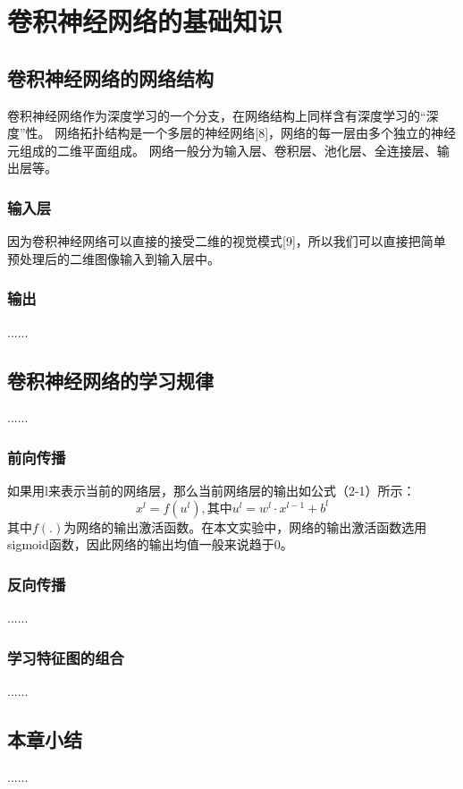 \section{卷积神经网络的基础知识}

\subsection{卷积神经网络的网络结构}
卷积神经网络作为深度学习的一个分支，在网络结构上同样含有深度学习的“深度”性。
网络拓扑结构是一个多层的神经网络[8]，网络的每一层由多个独立的神经元组成的二维平面组成。
网络一般分为输入层、卷积层、池化层、全连接层、输出层等。

\subsubsection{输入层}
因为卷积神经网络可以直接的接受二维的视觉模式[9]，所以我们可以直接把简单预处理后的二维图像输入到输入层中。

\subsubsection{输出}
......

\subsection{卷积神经网络的学习规律}
......

\subsubsection{前向传播}
如果用l来表示当前的网络层，那么当前网络层的输出如公式（2-1）所示：
\begin{equation}
    x^l = f(u^l), \mbox{其中} u^l = w^l \cdot x^{l-1} + b^l
\end{equation}
其中$f(.)$为网络的输出激活函数。在本文实验中，网络的输出激活函数选用sigmoid函数，因此网络的输出均值一般来说趋于0。

\subsubsection{反向传播}
......

\subsubsection{学习特征图的组合}
......

\subsection{本章小结}
......

\newpage
